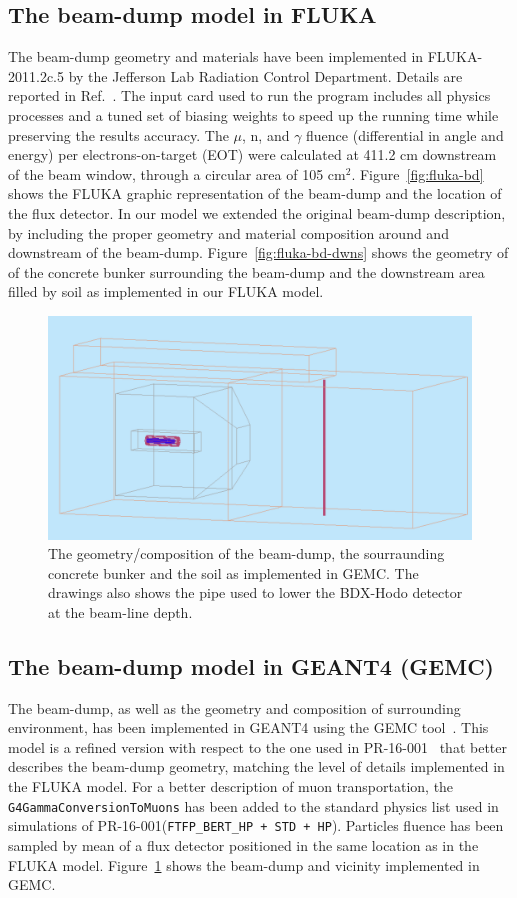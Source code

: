 \subsection{The beam-dump model in FLUKA} 
The beam-dump geometry and  materials have  been implemented in FLUKA-2011.2c.5 by the Jefferson Lab Radiation Control Department. Details are reported in Ref.~\cite{jnote-bd}.  The input card used to run the program  includes all physics processes and a tuned set of biasing weights to speed up the running time while preserving the  results accuracy. 
The $\mu$, n, and $\gamma$ fluence (differential in angle and energy) per electrons-on-target (EOT) were  calculated  at  411.2 cm downstream of the beam window, through a circular area of 105 cm$^2$. Figure~\ref{fig:fluka-bd} shows the FLUKA graphic representation of the beam-dump and the location of the flux detector.
In our model we extended the original beam-dump description, by including  
 the proper geometry and material composition around and downstream of the beam-dump.
Figure~\ref{fig:fluka-bd-dwns}  shows the geometry of of the concrete bunker surrounding the beam-dump and  the downstream area filled by soil as implemented in our FLUKA model.

\begin{figure}[h!] 
\center
\includegraphics[width=12.5cm]{figs/gemc-bd-dwns.pdf}  
\caption{The geometry/composition  of the beam-dump, the sourraunding concrete bunker and  the soil as implemented in GEMC. The drawings also shows the pipe used to lower the BDX-Hodo detector at the  beam-line depth.}
\label{fig:gemc-bd-dwns}
\end{figure}

\subsection{The beam-dump model in GEANT4 (GEMC)}
The beam-dump, as well as the geometry and composition  of surrounding environment,
 has been implemented in GEANT4 using the GEMC tool~\cite{gemc}. This model is a refined version with respect to the one used  in PR-16-001~\cite{bdx-proposal} that better describes the beam-dump geometry, matching the level of details  implemented in the FLUKA model. For a better description of  muon transportation, the {\tt G4GammaConversionToMuons} has been added to the standard physics list used in simulations of  PR-16-001({\tt FTFP\_BERT\_HP + STD + HP}).
Particles fluence has been sampled  by mean of a flux detector  positioned in the same location as in the FLUKA model.
Figure~\ref{fig:gemc-bd-dwns} shows the beam-dump and vicinity implemented in GEMC.

